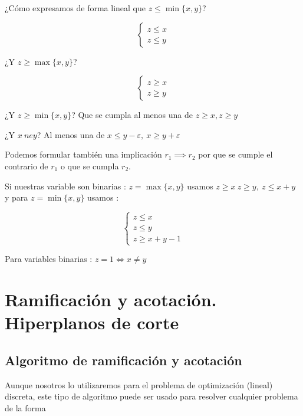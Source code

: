 \documentclass[openany]{book}
\begin{document}
\begin{exercise}
  ¿Cómo expresamos de forma lineal que $ z \leq \min \{x,y\} $? 
  
  $$ \left\{
  \begin{array}{l}
    z\leq x \\
    z\leq y
  \end{array}
  \right. $$
  
  ¿Y $ z \geq \max \{x,y\} $?

  $$ \left\{
  \begin{array}{l}
    z\geq x \\
    z \geq y
  \end{array}
  \right. $$

  ¿Y $ z \geq \min \{x,y\} $? Que se cumpla al menos una de $ z\geq x, z\geq y $

  ¿Y $ x\ ne y $? Al menos una de $ x \leq y - \varepsilon ,\ x \geq y+ \varepsilon $

  Podemos formular también una implicación $ r_1 \implies r_2 $ por que se cumple el contrario de $ r_1 $ o que se cumpla $ r_2 $.


  Si nuestras variable son binarias : $ z = \max \{x,y\} $ usamos $ z \geq x\ z \geq y,\ z\leq x+y $ y para $ z = \min \{x,y\} $ usamos :

  $$ \left\{
  \begin{array}{l}
    z \leq x \\
    z \leq y \\
    z \geq x+y-1
  \end{array}
  \right. $$

  Para variables binarias : $ z = 1 \iff x \ne y $

\end{exercise}





\chapter{Ramificación y acotación. Hiperplanos de corte}

\section{Algoritmo de ramificación y acotación}

Aunque nosotros lo utilizaremos para el problema de optimización (lineal) discreta, este tipo de algoritmo puede ser usado para resolver cualquier problema de la forma
\end{document}
